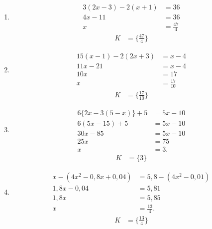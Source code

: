 \documentclass[11pt,a4paper]{article}
\begin{document}
\begin{zadaniReseniBox}[title={Domácí úkol}]
\begin{enumerate}[label=\alph*)]
\item
\[\begin{aligned}
3(2x-3)-2(x+1)&=36\\4x-11&=36\\x&=\frac{47}{4}
\end{aligned}\]
\[\begin{aligned}K&=\{\frac{47}{4}\}\end{aligned}\]

\item
\[\begin{aligned}
15(x-1)-2(2x+3)&=x-4\\11x-21&=x-4\\10x&=17\\x&=\frac{17}{10}
\end{aligned}\]
\[\begin{aligned}K&=\{\frac{17}{10}\}\end{aligned}\]

\item
\[\begin{aligned}6\{2x-3(5-x)\}+5&=5x-10\\6(5x-15)+5&=5x-10\\30x-85&=5x-10\\25x&=75\\x&=3.\end{aligned}\]
\[\begin{aligned}K&=\{3\}\end{aligned}\]

\item
\[\begin{aligned}x-(4x^2-0{,}8x+0{,}04)&=5{,}8-(4x^2-0{,}01)\\1{,}8x-0{,}04&=5{,}81\\1{,}8x&=5{,}85\\x&=\tfrac{13}{4}.\end{aligned}\]
\[\begin{aligned}K&=\{\frac{13}{4}\}\end{aligned}\]
\end{enumerate}
\end{zadaniReseniBox}


\end{document}
